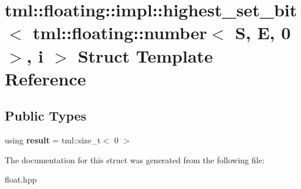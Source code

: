 \hypertarget{structtml_1_1floating_1_1impl_1_1highest__set__bit_3_01tml_1_1floating_1_1number_3_01S_00_01E_00_010_01_4_00_01i_01_4}{\section{tml\+:\+:floating\+:\+:impl\+:\+:highest\+\_\+set\+\_\+bit$<$ tml\+:\+:floating\+:\+:number$<$ S, E, 0 $>$, i $>$ Struct Template Reference}
\label{structtml_1_1floating_1_1impl_1_1highest__set__bit_3_01tml_1_1floating_1_1number_3_01S_00_01E_00_010_01_4_00_01i_01_4}
}
\subsection*{Public Types}
\begin{DoxyCompactItemize}
\item 
\hypertarget{structtml_1_1floating_1_1impl_1_1highest__set__bit_3_01tml_1_1floating_1_1number_3_01S_00_01E_00_010_01_4_00_01i_01_4_acfc27ac7c291fbc6dda7bc8b0b198e45}{using {\bfseries result} = tml\+::size\+\_\+t$<$ 0 $>$}\label{structtml_1_1floating_1_1impl_1_1highest__set__bit_3_01tml_1_1floating_1_1number_3_01S_00_01E_00_010_01_4_00_01i_01_4_acfc27ac7c291fbc6dda7bc8b0b198e45}

\end{DoxyCompactItemize}


The documentation for this struct was generated from the following file\+:\begin{DoxyCompactItemize}
\item 
float.\+hpp\end{DoxyCompactItemize}
